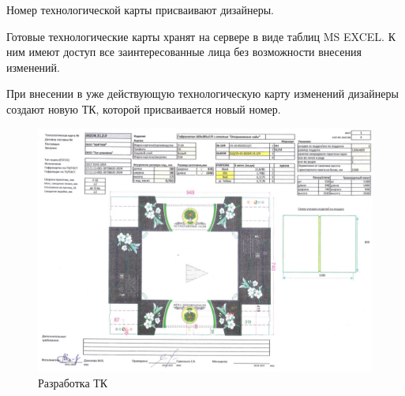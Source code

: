 Номер технологической карты присваивают дизайнеры.


Готовые технологические карты хранят на сервере в виде таблиц MS EXCEL. К ним имеют доступ все заинтересованные лица без возможности внесения изменений.

При внесении в уже действующую технологическую карту изменений дизайнеры создают новую ТК, которой присваивается новый номер.


\begin{figure}
\begin{center}
 \includegraphics[width=\linewidth, height=0.94\textheight, angle=90, keepaspectratio]{Pics/f15.jpg}
\end{center}
\caption{Разработка ТК}
\label{pic:f15}
\end{figure}

